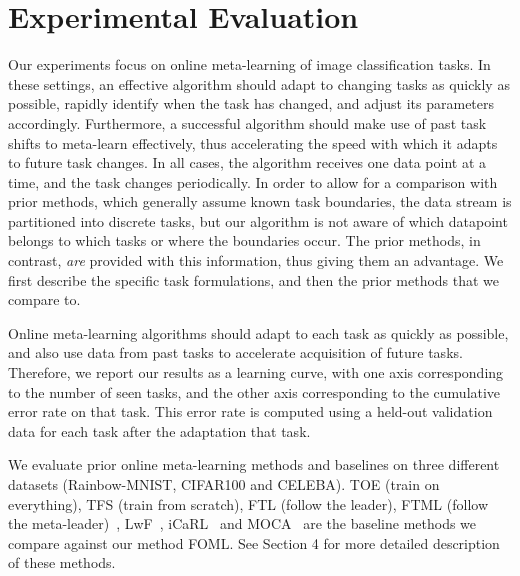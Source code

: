 
\section{Experimental Evaluation}

Our experiments focus on online meta-learning of image classification tasks. In these settings, an effective algorithm should adapt to changing tasks as quickly as possible, rapidly identify when the task has changed, and adjust its parameters accordingly. Furthermore, a successful algorithm should make use of past task shifts to meta-learn effectively, thus accelerating the speed with which it adapts to future task changes. In all cases, the algorithm receives one data point at a time, and the task changes periodically. In order to allow for a comparison with prior methods, which generally assume known task boundaries, the data stream is partitioned into discrete tasks, but our algorithm is not aware of which datapoint belongs to which tasks or where the boundaries occur. The prior methods, in contrast, \emph{are} provided with this information, thus giving them an advantage. We first describe the specific task formulations, and then the prior methods that we compare to.

Online meta-learning algorithms should adapt to each task as quickly as possible, and also use data from past tasks to accelerate acquisition of future tasks. Therefore, we report our results as a learning curve, with one axis corresponding to the number of seen tasks, and the other axis corresponding to the cumulative error rate on that task. This error rate is computed using a held-out validation data for each task after the adaptation that task. 

We evaluate prior online meta-learning methods and baselines on three different datasets (Rainbow-MNIST, CIFAR100 and CELEBA). TOE (train on everything), TFS (train from scratch), FTL (follow the leader), FTML (follow the meta-leader)~\citep{finn19a}, LwF~\citep{li2017learning}, iCaRL~\citep{rebuffi2016icarl} and MOCA~\citep{harrison2020continuous} are the baseline methods we compare against our method FOML. See Section 4 for more detailed description of these methods.

